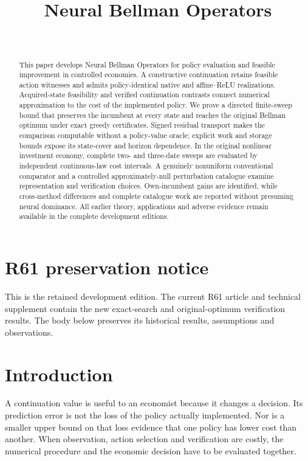 \documentclass[ecta,nameyear,draft]{econsocart}
\begin{document}
\begin{frontmatter}
\title{Neural Bellman Operators}
\begin{aug}
\author[id=au1,addressref={add1}]{~}
\address[id=add1]{Peking University}
\end{aug}
\begin{abstract}
This paper develops Neural Bellman Operators for policy evaluation and feasible improvement in controlled economies. A constructive continuation retains feasible action witnesses and admits policy-identical native and affine--ReLU realizations. Acquired-state feasibility and verified continuation contrasts connect numerical approximation to the cost of the implemented policy. We prove a directed finite-sweep bound that preserves the incumbent at every state and reaches the original Bellman optimum under exact greedy certificates. Signed residual transport makes the comparison computable without a policy-value oracle; explicit work and storage bounds expose its state-cover and horizon dependence. In the original nonlinear investment economy, complete two- and three-date sweeps are evaluated by independent continuous-law cost intervals. A genuinely nonuniform conventional comparator and a controlled approximately-null perturbation catalogue examine representation and verification choices. Own-incumbent gains are identified, while cross-method differences and complete catalogue work are reported without presuming neural dominance. All earlier theory, applications and adverse evidence remain available in the complete development editions.
\end{abstract}
\begin{keyword}
\end{keyword}
\end{frontmatter}
\section*{R61 preservation notice}
This is the retained development edition. The current R61 article and technical supplement contain the new exact-search and original-optimum verification results. The body below preserves its historical results, assumptions and observations.

\section{Introduction}\label{sec:introduction49}
A continuation value is useful to an economist because it changes a decision. Its prediction error is not the loss of the policy actually implemented. Nor is a smaller upper bound on that loss evidence that one policy has lower cost than another. When observation, action selection and verification are costly, the numerical procedure and the economic decision have to be evaluated together.
\end{document}
